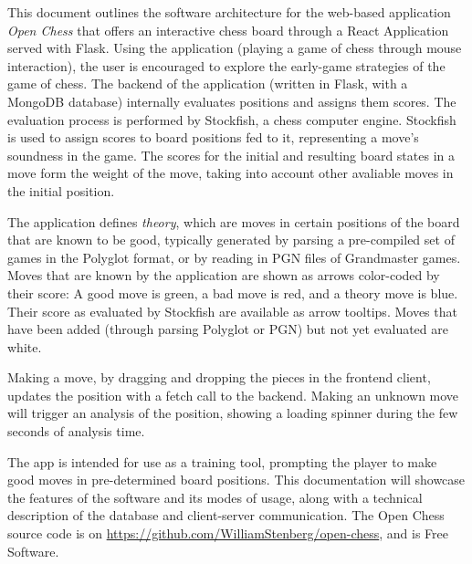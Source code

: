 \documentclass[architecture.tex]{subfiles}
\begin{document}
This document outlines the software architecture for the 
web-based application \textit{Open Chess} that offers
an interactive chess board through a React Application
served with Flask. 
Using the application (playing a game of chess through mouse interaction),
the user is encouraged to explore the early-game strategies of the game of chess.
The backend of the application (written in Flask, with a MongoDB database) 
internally evaluates positions and assigns them scores. 
The evaluation process is performed by Stockfish, a chess computer engine. 
Stockfish is used to assign scores to board positions fed to it, 
representing a move's soundness in the game. 
The scores for the initial and resulting board states in a move
form the weight of the move, taking into account 
other avaliable moves in the initial position.

The application defines \textit{theory}, which are moves in certain
positions of the board that are known to be good, typically generated by
parsing a pre-compiled set of games in the Polyglot format, or by reading
in PGN files of Grandmaster games.
Moves that are known by the application are shown as arrows color-coded by their
score: A good move is green, a bad move is red, and a theory move is blue.
Their score as evaluated by Stockfish are available as arrow tooltips.
Moves that have been added (through parsing Polyglot or PGN) but not yet evaluated
are white.

Making a move, by dragging and dropping the pieces in the frontend client,
updates the position with a fetch call to the backend. Making an unknown move
will trigger an analysis of the position, showing a loading spinner during
the few seconds of analysis time.

The app is intended for use as a training tool, prompting the player
to make good moves in pre-determined board positions.
This documentation will showcase the features of the software and
its modes of usage, along with a technical description of the database
and client-server communication.
The Open Chess source code is on \url{https://github.com/WilliamStenberg/open-chess},
and is Free Software.
\end{document}
